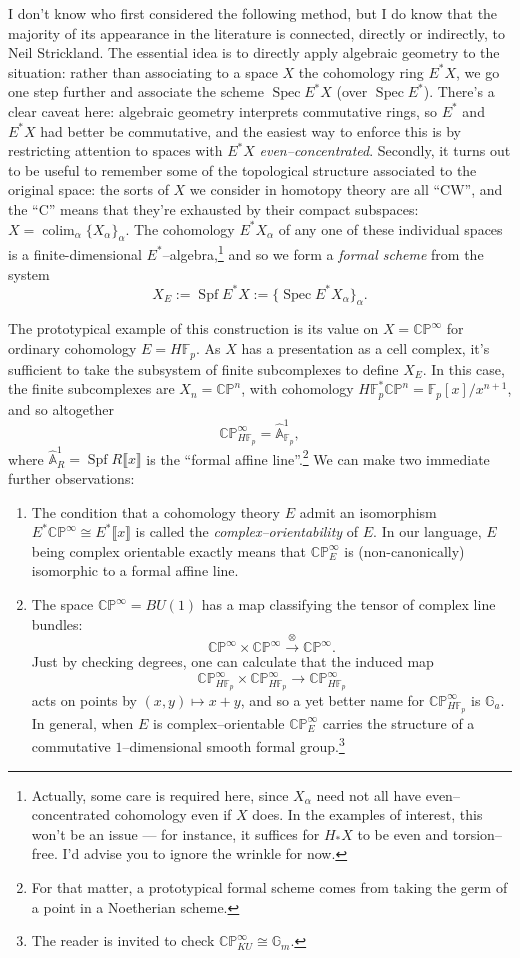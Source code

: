 \documentclass{amsart}
\newcommand{\F}{\mathbb F}
\newcommand{\G}{\mathbb G}
\newcommand{\C}{\mathbb{C}}
\newcommand{\CP}{\C\P}
\newcommand{\A}{\widehat{\mathbb{A}}}
\renewcommand{\P}{\mathbb{P}}
\newcommand{\<}{\langle}
\renewcommand{\>}{\rangle}
\DeclareMathOperator{\Spec}{Spec}
\DeclareMathOperator{\Spf}{Spf}
\DeclareMathOperator{\colim}{colim}
\theoremstyle{plain}
\theoremstyle{definition}
\theoremstyle{remark}
\begin{document}
I don't know who first considered the following method, but I do know that the majority of its appearance in the literature is connected, directly or indirectly, to Neil Strickland.  The essential idea is to directly apply algebraic geometry to the situation: rather than associating to a space $X$ the cohomology ring $E^* X$, we go one step further and associate the scheme $\Spec E^* X$ (over $\Spec E^*$).  There's a clear caveat here: algebraic geometry interprets commutative rings, so $E^*$ and $E^* X$ had better be commutative, and the easiest way to enforce this is by restricting attention to spaces with $E^* X$ \emph{even--concentrated}.  Secondly, it turns out to be useful to remember some of the topological structure associated to the original space: the sorts of $X$ we consider in homotopy theory are all ``CW'', and the ``C'' means that they're exhausted by their compact subspaces: $X = \colim_\alpha \{X_\alpha\}_\alpha$.  The cohomology $E^* X_\alpha$ of any one of these individual spaces is a finite-dimensional $E^*$--algebra,\footnote{Actually, some care is required here, since $X_\alpha$ need not all have even--concentrated cohomology even if $X$ does. In the examples of interest, this won't be an issue --- for instance, it suffices for $H_* X$ to be even and torsion--free. I'd advise you to ignore the wrinkle for now.} and so we form a \emph{formal scheme} from the system \[X_E := \Spf E^* X := \{\Spec E^* X_\alpha\}_{\alpha}.\]

The prototypical example of this construction is its value on $X = \CP^\infty$ for ordinary cohomology $E = H\F_p$.  As $X$ has a presentation as a cell complex, it's sufficient to take the subsystem of finite subcomplexes to define $X_E$.  In this case, the finite subcomplexes are $X_n = \CP^n$, with cohomology $H\F_p^* \CP^n = \F_p[x] / x^{n+1}$, and so altogether \[\CP^\infty_{H\F_p} = \A^1_{\F_p},\] where $\A^1_R = \Spf R\llbracket x \rrbracket$ is the ``formal affine line''.\footnote{For that matter, a prototypical formal scheme comes from taking the germ of a point in a Noetherian scheme.}  We can make two immediate further observations:

\begin{enumerate}
\item The condition that a cohomology theory $E$ admit an isomorphism $E^* \CP^\infty \cong E^*\llbracket x \rrbracket$ is called the \emph{complex--orientability} of $E$.  In our language, $E$ being complex orientable exactly means that $\CP^\infty_E$ is (non-canonically) isomorphic to a formal affine line.
\item The space $\CP^\infty = BU(1)$ has a map classifying the tensor of complex line bundles: \[\CP^\infty \times \CP^\infty \xrightarrow{\otimes} \CP^\infty.\]  Just by checking degrees, one can calculate that the induced map \[\CP^\infty_{H\F_p} \times \CP^\infty_{H\F_p} \to \CP^\infty_{H\F_p}\] acts on points by $(x, y) \mapsto x + y$, and so a yet better name for $\CP^\infty_{H\F_p}$ is $\G_a$.  In general, when $E$ is complex--orientable $\CP^\infty_E$ carries the structure of a commutative $1$--dimensional smooth formal group.\footnote{The reader is invited to check $\CP^\infty_{KU} \cong \G_m$.}
\end{enumerate}
\end{document}
